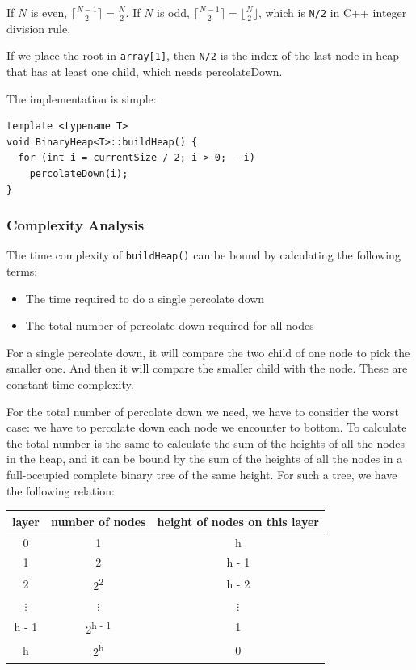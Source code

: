 \documentclass[11pt]{book}
\begin{document}
If \(N\) is even, \(\lceil \frac {N - 1} {2} \rceil = \frac {N} {2}\). If \(N\) is odd, \(\lceil \frac {N - 1} {2} \rceil = \lfloor \frac {N} {2} \rfloor\), which is \texttt{N/2} in C++ integer division rule.

If we place the root in \texttt{array[1]}, then \texttt{N/2} is the index of the last node in heap that has at least one child, which needs percolateDown.

The implementation is simple:
\begin{verbatim}
template <typename T>
void BinaryHeap<T>::buildHeap() {
  for (int i = currentSize / 2; i > 0; --i)
    percolateDown(i);
}
\end{verbatim}
\subsubsection{Complexity Analysis}
\label{sec:orgc296c09}

The time complexity of \texttt{buildHeap()} can be bound by calculating the following terms:
\begin{itemize}
\item The time required to do a single percolate down
\item The total number of percolate down required for all nodes
\end{itemize}

For a single percolate down, it will compare the two child of one node to pick the smaller one. And then it will compare the smaller child with the node. These are constant time complexity.

For the total number of percolate down we need, we have to consider the worst case: we have to percolate down each node we encounter to bottom. To calculate the total number is the same to calculate the sum of the heights of all the nodes in the heap, and it can be bound by the sum of the heights of all the nodes in a full-occupied complete binary tree of the same height. For such a tree, we have the following relation:
\begin{center}
\begin{tabular}{ccc}
\hline
layer & number of nodes & height of nodes on this layer\\
\hline
0 & 1 & h\\
1 & 2 & h - 1\\
2 & 2\textsuperscript{2} & h - 2\\
\(\vdots\) & \(\vdots\) & \(\vdots\)\\
h - 1 & 2\textsuperscript{h - 1} & 1\\
h & 2\textsuperscript{h} & 0\\
\hline
\end{tabular}
\end{center}
\end{document}
